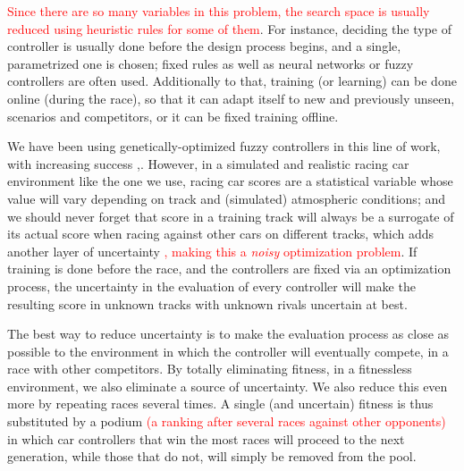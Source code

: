 \documentclass[10pt,journal,compsoc]{IEEEtran}
\begin{document}
\textcolor{red}{Since there are so many variables in this problem, the search space is usually reduced using heuristic rules for some of them}. For instance, deciding the type of controller is usually
done before the design process begins, and a single, parametrized one
is chosen; fixed rules as well as neural networks \cite{KIM201287} or fuzzy controllers \cite{PerezEvolvingFuzzy09} are often used. 
Additionally to that, training (or learning) \cite{Loiacono:2012:LEA:2212908.2212953} can be done online (during the
race), so that it can adapt itself to new and previously unseen,
scenarios and competitors, or it can be fixed training offline. 

We have been using genetically-optimized fuzzy controllers in this line of work, with increasing success \cite{salem_evo17},\cite{salem_evo18}.
However, in a simulated and realistic racing car environment like the one we use, racing car scores are a
    statistical variable whose value will vary depending on track and
    (simulated) atmospheric conditions; and we should never forget
    that score in a training track will always be a surrogate of its
    actual score when racing against other cars on different tracks,
    which adds another layer of uncertainty
\textcolor{red}{, making this a {\em noisy} optimization problem}.
If training is done before the
    race, and the controllers are fixed via an optimization process,
    the uncertainty in the evaluation of every controller will make
    the resulting score in unknown tracks with unknown rivals
    uncertain at best.

The best way to reduce uncertainty is to make the evaluation process
as close as possible to the environment in which the controller will
eventually compete, in a race with other competitors. By totally
eliminating fitness, in a fitnessless environment, we also eliminate
a source of uncertainty. We also reduce this even more by repeating
races several times. A single (and uncertain) fitness is thus
substituted by a podium 
\textcolor{red}{
(a ranking after several races against other opponents) 
}
in which car controllers that win the most races will proceed to the next generation, while those that do not, will simply be removed from the pool. 
\end{document}
